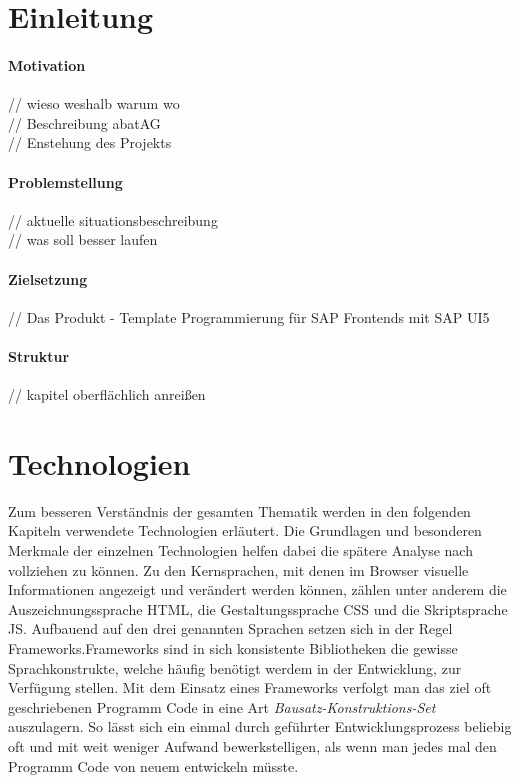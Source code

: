 \documentclass[12pt,a4paper,bibliography=totocnumbered,listof=totocnumbered]{scrartcl}
\begin{document}
\section{Einleitung}
\paragraph{Motivation}
// wieso weshalb warum wo\\
// Beschreibung abatAG\\
// Enstehung des Projekts\\

\paragraph{Problemstellung}
// aktuelle situationsbeschreibung\\
// was soll besser laufen\\

\paragraph{Zielsetzung}
// Das Produkt - Template Programmierung für SAP Frontends mit SAP UI5

\paragraph{Struktur}
// kapitel oberflächlich anreißen\\
\pagebreak

\section{Technologien}
Zum besseren Verständnis der gesamten Thematik werden in den folgenden Kapiteln verwendete Technologien erläutert. Die Grundlagen und besonderen Merkmale der einzelnen Technologien helfen dabei die spätere Analyse nach vollziehen zu können. Zu den Kernsprachen, mit denen im Browser visuelle Informationen angezeigt und verändert werden können, zählen unter anderem die Auszeichnungssprache \ac{HTML}, die Gestaltungssprache \ac{CSS} und die Skriptsprache \ac{JS}. Aufbauend auf den drei genannten Sprachen setzen sich in der Regel Frameworks.Frameworks sind in sich konsistente Bibliotheken die gewisse Sprachkonstrukte, welche häufig benötigt werdem in der Entwicklung, zur Verfügung stellen. Mit dem Einsatz eines Frameworks verfolgt man das ziel oft geschriebenen Programm Code in eine Art \textit{Bausatz-Konstruktions-Set} auszulagern. So lässt sich ein einmal durch geführter Entwicklungsprozess beliebig oft und mit weit weniger Aufwand bewerkstelligen, als wenn man jedes mal den Programm Code von neuem entwickeln müsste.
\end{document}
